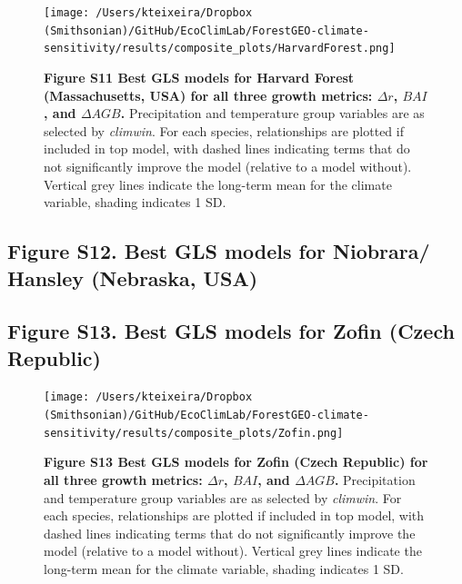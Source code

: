 \documentclass[
]{article}
\begin{document}
\begin{figure}
\centering
\texttt{[image: /Users/kteixeira/Dropbox (Smithsonian)/GitHub/EcoClimLab/ForestGEO-climate-sensitivity/results/composite\_plots/HarvardForest.png]}
\caption{\textbf{Figure S11 \textbar{} Best GLS models for Harvard
Forest (Massachusetts, USA) for all three growth metrics: \(\Delta r\),
\(BAI\), and \(\Delta AGB\).} Precipitation and temperature group
variables are as selected by \emph{climwin}. For each species,
relationships are plotted if included in top model, with dashed lines
indicating terms that do not significantly improve the model (relative
to a model without). Vertical grey lines indicate the long-term mean for
the climate variable, shading indicates 1 SD.}
\end{figure}

\newpage

\hypertarget{figure-s12.-best-gls-models-for-niobrara-hansley-nebraska-usa}{%
\subsection{Figure S12. Best GLS models for Niobrara/ Hansley (Nebraska,
USA)}\label{figure-s12.-best-gls-models-for-niobrara-hansley-nebraska-usa}}

\newpage

\hypertarget{figure-s13.-best-gls-models-for-zofin-czech-republic}{%
\subsection{Figure S13. Best GLS models for Zofin (Czech
Republic)}\label{figure-s13.-best-gls-models-for-zofin-czech-republic}}

\begin{figure}
\centering
\texttt{[image: /Users/kteixeira/Dropbox (Smithsonian)/GitHub/EcoClimLab/ForestGEO-climate-sensitivity/results/composite\_plots/Zofin.png]}
\caption{\textbf{Figure S13 \textbar{} Best GLS models for Zofin (Czech
Republic) for all three growth metrics: \(\Delta r\), \(BAI\), and
\(\Delta AGB\).} Precipitation and temperature group variables are as
selected by \emph{climwin}. For each species, relationships are plotted
if included in top model, with dashed lines indicating terms that do not
significantly improve the model (relative to a model without). Vertical
grey lines indicate the long-term mean for the climate variable, shading
indicates 1 SD.}
\end{figure}

\newpage
\end{document}
